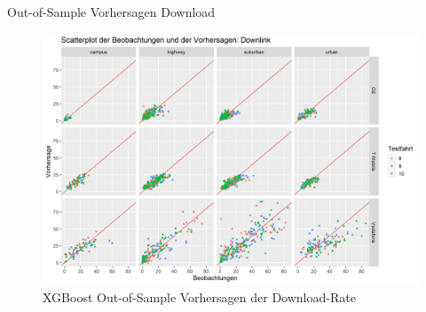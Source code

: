 \begin{frame}{Out-of-Sample Vorhersagen Download}
    \begin{figure}[h]
        \centering
        \includegraphics[scale=0.33]{plots/xgboost/downlink/scatter_colored_axes_fixed}
        \caption{XGBoost Out-of-Sample Vorhersagen der Download-Rate}
        \label{xgboost_scatter_colored_downlink}
    \end{figure}
\end{frame}